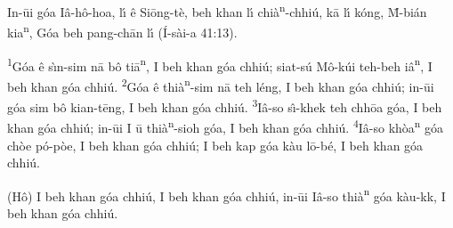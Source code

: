 \documentclass{article}
\newcommand*{\nn}{\textsuperscript{n}}
\newcommand*{\pehin}[1]{\stackinset{c}{}{b}{5.5pt}{\small\ttfamily\char'15}{#1}}
\newcommand*{\pehinbf}[1]{\stackinset{c}{}{b}{5.5pt}{\ttfamily\char'15}{#1}}
\newcommand*{\dtr}{\raisebox{3.5pt}{$\scalebox{.3}{$\bullet$}$}}
\newcommand*{\dtrbf}{\raisebox{3.5pt}{$\scalebox{.5}{$\bullet$}$}}
\begin{document}
{\rmfamily
\par
In-\={u}i g\'{o}a I\^{a}-h\^{o}-hoa, l\'{\i} \^{e} Si\={o}ng-t\`{e}, beh khan l\'{\i} chi\`{a}{\nn}-chhi\'{u}, k\={a} l\'{\i} k\'{o}ng, \={M}-bi\'{a}n kia{\nn}, G\'{o}a beh pang-ch\={a}n l\'{\i} (\'{I}-s\`{a}i-a 41:13).\\
\par
\textsuperscript{1}G\'{o}a \^{e} s\`{\i}n-sim n\={a} b\^{o} ti\={a}{\nn}, I beh khan g\'{o}a chhi\'{u}; siat-s\'{u} M\^{o}{\dtr}-k\'{u}i teh-beh i\^{a}{\nn}, I beh khan g\'{o}a chhi\'{u}. 
\textsuperscript{2}G\'{o}a \^{e} thi\`{a}{\nn}-sim n\={a} teh l\'{e}ng, I beh khan g\'{o}a chhi\'{u}; in-\={u}i g\'{o}a sim b\^{o} kian-t\={e}ng, I beh khan g\'{o}a chhi\'{u}. 
\textsuperscript{3}I\^{a}-so{\dtr} s\^{\i}-khek teh chh\={o}a g\'{o}a, I beh khan g\'{o}a chhi\'{u}; in-\={u}i I \={u} thi\`{a}{\nn}-sioh g\'{o}a, I beh khan g\'{o}a chhi\'{u}. 
\textsuperscript{4}I\^{a}-so{\dtr} kh\`{o}a{\nn} g\'{o}a ch\`{o}e p\'{o}-p\`{o}e, I beh khan g\'{o}a chhi\'{u}; I beh kap g\'{o}a k\`{a}u l\={o}{\dtr}-b\'{e},  I beh khan g\'{o}a chhi\'{u}.\newline
\par
(H\^{o}) I beh khan g\'{o}a chhi\'{u}, I beh khan g\'{o}a chhi\'{u}, in-\={u}i I\^{a}-so{\dtr} thi\`{a}{\nn} g\'{o}a k\`{a}u-k\pehin{e}k, I beh khan g\'{o}a chhi\'{u}.\\
}
\end{document}
